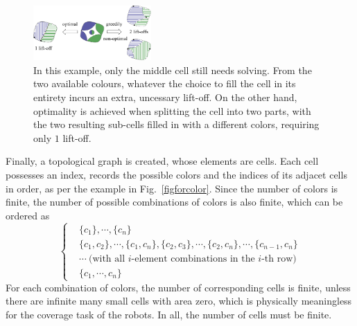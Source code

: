 \documentclass[journal]{IEEEtran}
\begin{document}
\begin{figure}[t]
\centering
\includegraphics[width = 0.4\textwidth]{simple_example/simple_3}
\caption{
In this example, only the middle cell still needs solving. From the two available colours, whatever the choice to fill the cell in its entirety incurs an extra, uncessary lift-off. On the other hand, optimality is achieved when splitting the cell into two parts, 
with the two resulting sub-cells filled in with a different colors, requiring only $1$ lift-off. 
}\label{figsimpleexample}
\end{figure}


Finally, a topological graph is created, whose elements are cells. Each cell possesses an index, records the possible colors 
and the indices of its adjacet cells in order, as per the example in Fig.~\ref{figforcolor}. 
Since the number of colors is finite, the number of possible combinations of colors is also finite, which can be ordered as
$$\left\{
\begin{aligned}
&\{c_1\}, \cdots, \{c_n\}\\
&\{c_1, c_2\}, \cdots, \{c_1, c_n\}, \{c_2, c_3\}, \cdots, \{c_2, c_n\}, \cdots, \{c_{n-1}, c_n\}\\
&\cdots\ \mbox{(with all $i$-element combinations in the $i$-th row)}\\
&\{c_1, \cdots, c_n\}
\end{aligned}
\right.$$
For each combination of colors, the number of corresponding cells is finite, unless there are infinite many small cells with area zero, which is physically meaningless for the coverage task of the robots. In all, the number of cells must be finite. 
\end{document}
